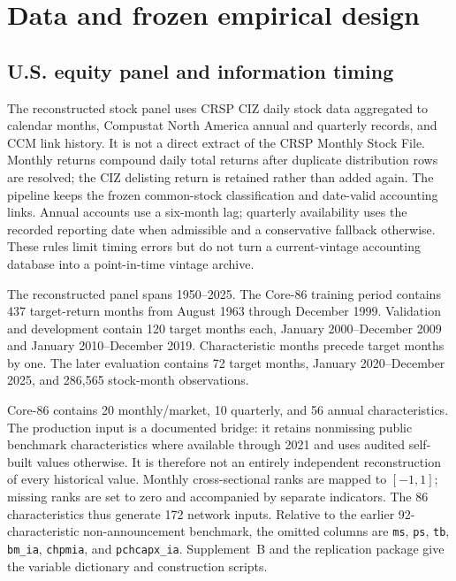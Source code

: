 \section{Data and frozen empirical design}

\subsection{U.S. equity panel and information timing}

The reconstructed stock panel uses CRSP CIZ daily stock data aggregated to calendar months, Compustat North America annual and quarterly records, and CCM link history. It is not a direct extract of the CRSP Monthly Stock File. Monthly returns compound daily total returns after duplicate distribution rows are resolved; the CIZ delisting return is retained rather than added again. The pipeline keeps the frozen common-stock classification and date-valid accounting links. Annual accounts use a six-month lag; quarterly availability uses the recorded reporting date when admissible and a conservative fallback otherwise. These rules limit timing errors but do not turn a current-vintage accounting database into a point-in-time vintage archive.

The reconstructed panel spans 1950--2025. The Core-86 training period contains 437 target-return months from August 1963 through December 1999. Validation and development contain 120 target months each, January 2000--December 2009 and January 2010--December 2019. Characteristic months precede target months by one. The later evaluation contains 72 target months, January 2020--December 2025, and 286,565 stock-month observations.

Core-86 contains 20 monthly/market, 10 quarterly, and 56 annual characteristics. The production input is a documented bridge: it retains nonmissing public benchmark characteristics where available through 2021 and uses audited self-built values otherwise. It is therefore not an entirely independent reconstruction of every historical value. Monthly cross-sectional ranks are mapped to $[-1,1]$; missing ranks are set to zero and accompanied by separate indicators. The 86 characteristics thus generate 172 network inputs. Relative to the earlier 92-characteristic non-announcement benchmark, the omitted columns are \texttt{ms}, \texttt{ps}, \texttt{tb}, \texttt{bm\_ia}, \texttt{chpmia}, and \texttt{pchcapx\_ia}. Supplement~B and the replication package give the variable dictionary and construction scripts.

